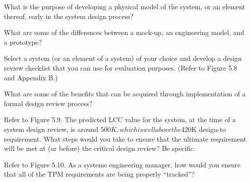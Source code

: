 \begin{exercises}
    \begin{exercise}
    \label{sea-5-12}
        What is the purpose of developing a physical model of the system, or an element thereof, early in the system design process?
    \end{exercise}
    \begin{solution}
    \end{solution}
    
    \begin{exercise}
    \label{sea-5-13}
        What are some of the differences between a mock-up, an engineering model, and a prototype?
    \end{exercise}
    \begin{solution}
    \end{solution}
    
    \begin{exercise}
    \label{sea-5-14}
        Select a system (or an element of a system) of your choice and develop a design review checklist that you can use for evaluation purposes. (Refer to Figure 5.8 and Appendix B.)
    \end{exercise}
    \begin{solution}
    \end{solution}
    
    \begin{exercise}
    \label{sea-5-15}
        What are some of the benefits that can be acquired through implementation of a formal design review process?
    \end{exercise}
    \begin{solution}
    \end{solution}
    
    \begin{exercise}
    \label{sea-5-16}
        Refer to Figure 5.9. The predicted LCC value for the system, at the time of a system design review, is around $500K, which is well above the $420K design-to requirement. What steps would you take to ensure that the ultimate requirement will be met at (or before) the critical design review? Be specific.
    \end{exercise}
    \begin{solution}
    \end{solution}
    
    \begin{exercise}
    \label{sea-5-17}
        Refer to Figure 5.10. As a systems engineering manager, how would you ensure that all of the TPM requirements are being properly “tracked”?
    \end{exercise}
    \begin{solution}
    \end{solution}
    

\end{exercises}
